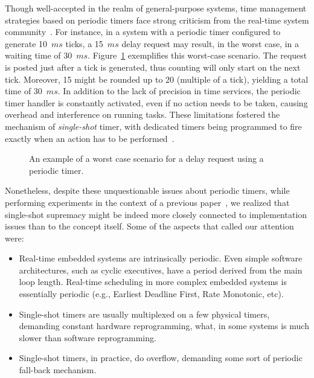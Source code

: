 \documentclass[final,3pd,times]{elsarticle}
\newcommand{\fig}[4][tbp]{
  \begin{figure}[#1]
    {\centering{\texttt{[image: \#2]}}\par}
    \caption{#3}
    \label{fig:#2}
  \end{figure}
}
\newcommand{\ms}{$ms$}
\begin{document}
Though well-accepted in the realm of general-purpose systems, time
management strategies based on periodic timers face strong criticism
from the real-time system community~\cite{Tsafrir:2005}. For instance,
in a system with a periodic timer configured to generate 10~\ms{} ticks,
a 15~\ms{} delay request may result, in the worst case, in a waiting
time of 30~\ms{}. Figure~\ref{fig:worst_case_periodic_timer} exemplifies
this worst-case scenario. The request is posted just after a tick is
generated, thus counting will only start on the next tick. Moreover, 15
might be rounded up to 20 (multiple of a tick), yielding a total time of
30~\ms. In addition to the lack of precision in time services, the
periodic timer handler is constantly activated, even if no action needs
to be taken, causing overhead and interference on running tasks.  These
limitations fostered the mechanism of \emph{single-shot} timer, with
dedicated timers being programmed to fire exactly when an action has to
be performed~\cite{Tsafrir:2005,Aron:2000,Goel:2002}.

\fig{worst_case_periodic_timer}{An example of a worst case scenario for
  a delay request using a periodic timer.}{scale=.6}

Nonetheless, despite these unquestionable issues about periodic timers,
while performing experiments in the context of a previous
paper~\cite{Gracioli2008}, we realized that single-shot supremacy might
be indeed more closely connected to implementation issues than to the
concept itself. Some of the aspects that called our attention were:

\begin{itemize}
\item Real-time embedded systems are intrinsically periodic. Even simple
  software architectures, such as cyclic executives, have a period
  derived from the main loop length. Real-time scheduling in more
  complex embedded systems is essentially periodic (e.g., Earliest
  Deadline First, Rate Monotonic, etc).

\item Single-shot timers are usually multiplexed on a few physical
  timers, demanding constant hardware reprogramming, what, in some
  systems is much slower than software reprogramming.

\item Single-shot timers, in practice, do overflow, demanding some sort
  of periodic fall-back mechanism.
\end{itemize}
\end{document}
